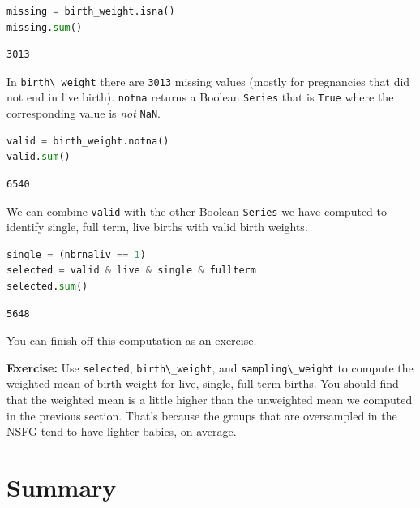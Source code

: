 \begin{lstlisting}[language=Python,style=source]
missing = birth_weight.isna()
missing.sum()
\end{lstlisting}

\begin{lstlisting}[style=output]
3013
\end{lstlisting}

In \passthrough{\lstinline!birth\_weight!} there are
\passthrough{\lstinline!3013!} missing values (mostly for pregnancies
that did not end in live birth). \passthrough{\lstinline!notna!} returns
a Boolean \passthrough{\lstinline!Series!} that is
\passthrough{\lstinline!True!} where the corresponding value is
\emph{not} \passthrough{\lstinline!NaN!}.

\begin{lstlisting}[language=Python,style=source]
valid = birth_weight.notna()
valid.sum()
\end{lstlisting}

\begin{lstlisting}[style=output]
6540
\end{lstlisting}

We can combine \passthrough{\lstinline!valid!} with the other Boolean
\passthrough{\lstinline!Series!} we have computed to identify single,
full term, live births with valid birth weights.

\begin{lstlisting}[language=Python,style=source]
single = (nbrnaliv == 1)
selected = valid & live & single & fullterm
selected.sum()
\end{lstlisting}

\begin{lstlisting}[style=output]
5648
\end{lstlisting}

You can finish off this computation as an exercise.

\textbf{Exercise:} Use \passthrough{\lstinline!selected!},
\passthrough{\lstinline!birth\_weight!}, and
\passthrough{\lstinline!sampling\_weight!} to compute the weighted mean
of birth weight for live, single, full term births. You should find that
the weighted mean is a little higher than the unweighted mean we
computed in the previous section. That's because the groups that are
oversampled in the NSFG tend to have lighter babies, on average.

\hypertarget{summary}{%
\section{Summary}\label{summary}}


